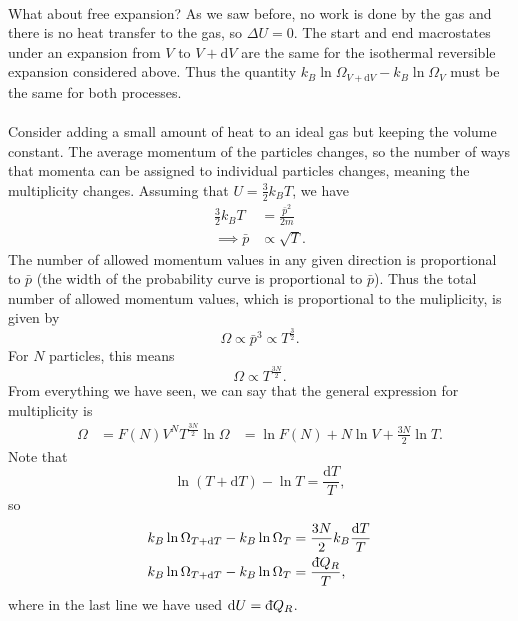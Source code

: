 \documentclass[../thermodynamics.tex]{subfiles}
\begin{document}
        \paragraph{}
        What about free expansion?
        As we saw before, no work is done by the gas and there is no heat transfer to the gas, so $\Delta U=0$.
        The start and end macrostates under an expansion from $V$ to $V+\mathrm{d}V$ are the same for the isothermal reversible expansion considered above.
        Thus the quantity $k_B\ln\Omega_{V+\mathrm{d}V}-k_B\ln\Omega_V$ must be the same for both processes.

        \paragraph{}
        Consider adding a small amount of heat to an ideal gas but keeping the volume constant.
        The average momentum of the particles changes, so the number of ways that momenta can be assigned to individual particles changes, meaning the multiplicity changes.
        Assuming that $U=\frac{3}{2}k_BT$, we have
        \begin{align}
            \frac{3}{2}k_BT&=\frac{\bar{p}^2}{2m}\\
            \implies\bar{p}&\propto\sqrt{T}.
        \end{align}
        The number of allowed momentum values in any given direction is proportional to $\bar{p}$ (the width of the probability curve is proportional to $\bar{p}$).
        Thus the total number of allowed momentum values, which is proportional to the muliplicity, is given by
        \begin{equation}
            \Omega\propto\bar{p}^3\propto T^\frac{3}{2}.
        \end{equation}
        For $N$ particles, this means
        \begin{equation}
            \Omega\propto T^\frac{3N}{2}.
        \end{equation}
        From everything we have seen, we can say that the general expression for multiplicity is
        \begin{align}
            \Omega&=F(N)V^NT^\frac{3N}{2}
            \ln\Omega&=\ln F(N)+N\ln V+\frac{3N}{2}\ln T.
        \end{align}
        Note that
        \begin{equation}
            \ln(T+\mathrm{d}T)-\ln T=\frac{\mathrm{d}T}{T},
        \end{equation}
        so
        \begin{align}
            k_B\ln\Omega_{T+\mathrm{d}T}-k_B\ln\Omega_T&=\frac{3N}{2}k_B\frac{\mathrm{d}T}{T}\\
            k_B\ln\Omega_{T+\mathrm{d}T}-k_B\ln\Omega_T&=\frac{\dbar{Q}_R}{T},
        \end{align}
        where in the last line we have used $\mathrm{d}U=\dbar{Q}_R$.
\end{document}
